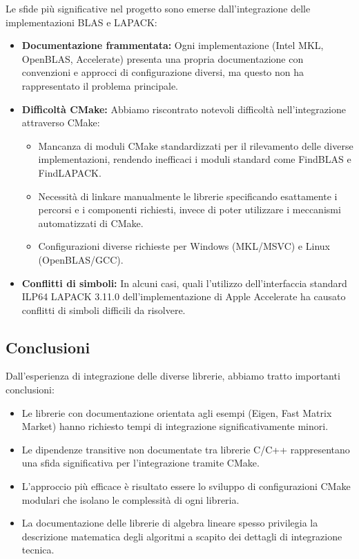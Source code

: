 Le sfide più significative nel progetto sono emerse dall'integrazione delle implementazioni BLAS e LAPACK:

\begin{itemize}
    \item \textbf{Documentazione frammentata:} Ogni implementazione (Intel MKL, OpenBLAS, Accelerate) presenta una propria documentazione con convenzioni e approcci di configurazione diversi, ma questo non ha rappresentato il problema principale.
    
    \item \textbf{Difficoltà CMake:} Abbiamo riscontrato notevoli difficoltà nell'integrazione attraverso CMake:
    \begin{itemize}
        \item Mancanza di moduli CMake standardizzati per il rilevamento delle diverse implementazioni, rendendo inefficaci i moduli standard come FindBLAS e FindLAPACK.
        \item Necessità di linkare manualmente le librerie specificando esattamente i percorsi e i componenti richiesti, invece di poter utilizzare i meccanismi automatizzati di CMake.
        \item Configurazioni diverse richieste per Windows (MKL/MSVC) e Linux (OpenBLAS/GCC).
    \end{itemize}
    
    \item \textbf{Conflitti di simboli:} In alcuni casi, quali l'utilizzo dell'interfaccia standard ILP64 LAPACK 3.11.0 dell'implementazione di Apple Accelerate ha causato conflitti di simboli difficili da risolvere.
\end{itemize}

\subsection{Conclusioni}

Dall'esperienza di integrazione delle diverse librerie, abbiamo tratto importanti conclusioni:

\begin{itemize}
    \item Le librerie con documentazione orientata agli esempi (Eigen, Fast Matrix Market) hanno richiesto tempi di integrazione significativamente minori.
    
    \item Le dipendenze transitive non documentate tra librerie C/C++ rappresentano una sfida significativa per l'integrazione tramite CMake.
    
    \item L'approccio più efficace è risultato essere lo sviluppo di configurazioni CMake modulari che isolano le complessità di ogni libreria.
    
    \item La documentazione delle librerie di algebra lineare spesso privilegia la descrizione matematica degli algoritmi a scapito dei dettagli di integrazione tecnica.
\end{itemize}


